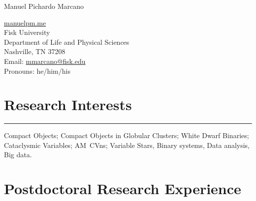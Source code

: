 \documentclass[letterpaper,10pt]{article}
\def\name{Manuel Pichardo Marcano}
\begin{document}
\begin{huge}
\name
\end{huge}





\vspace{.3 cm}

\begin{minipage}{0.6\linewidth}
  \href{www.manuelpm.me}{manuelpm.me} \\
Fisk University \\
  Department of Life and Physical Sciences \\
  Nashville, TN 37208\\
Email:  \href{mailto:mmarcano@fisk.edu}{mmarcano@fisk.edu}\\
 Pronouns: he/him/his 
\end{minipage}

\section*{Research Interests}

\hrule
\vspace{.3 cm}


Compact Objects; Compact Objects in Globular Clusters; White Dwarf Binaries; Cataclysmic Variables; AM~CVns; Variable Stars, Binary systems, Data analysis, Big data. 



\section*{Postdoctoral Research Experience}
\end{document}
